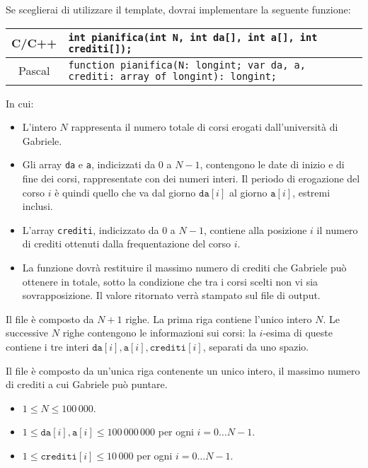 Se sceglierai di utilizzare il template, dovrai implementare la seguente funzione:
\begin{center}\begin{tabularx}{\textwidth}{|c|X|}
\hline
C/C++  & \verb|int pianifica(int N, int da[], int a[], int crediti[]);|\\
\hline
Pascal & \verb|function pianifica(N: longint; var da, a, crediti: array of longint): longint;|\\
\hline
\end{tabularx}\end{center}
In cui:
\begin{itemize}[nolistsep]
  \item L'intero $N$ rappresenta il numero totale di corsi erogati dall'università di Gabriele.
  \item Gli array \texttt{da} e \texttt{a}, indicizzati da $0$ a $N-1$, contengono le date di inizio e di fine dei corsi, rappresentate con dei numeri interi. Il periodo di erogazione del corso $i$ è quindi quello che va dal giorno $\texttt{da}[i]$ al giorno $\texttt{a}[i]$, estremi inclusi.
  \item L'array \texttt{crediti}, indicizzato da $0$ a $N-1$, contiene alla posizione $i$ il numero di crediti ottenuti dalla frequentazione del corso $i$.
  \item La funzione dovrà restituire il massimo numero di crediti che Gabriele può ottenere in totale, sotto la condizione che tra i corsi scelti non vi sia sovrapposizione. Il valore ritornato verrà stampato sul file di output.
\end{itemize}

\InputFile
Il file  è composto da $N+1$ righe. La prima riga contiene l'unico intero $N$. Le successive $N$ righe contengono le informazioni sui corsi: la $i$-esima di queste contiene i tre interi $\texttt{da}[i], \texttt{a}[i], \texttt{crediti}[i]$, separati da uno spazio.

\OutputFile
Il file \outputfile{} è composto da un'unica riga contenente un unico intero, il massimo numero di crediti a cui Gabriele può puntare.

\Constraints
\begin{itemize}[nolistsep, itemsep=2mm]
	\item $1 \le N \le 100\,000$.
	\item $1 \le \texttt{da}[i], \texttt{a}[i] \le 100\,000\,000$ per ogni $i=0\ldots N-1$.
	\item $1 \le \texttt{crediti}[i] \le 10\,000$ per ogni $i=0\ldots N-1$.
\end{itemize}


